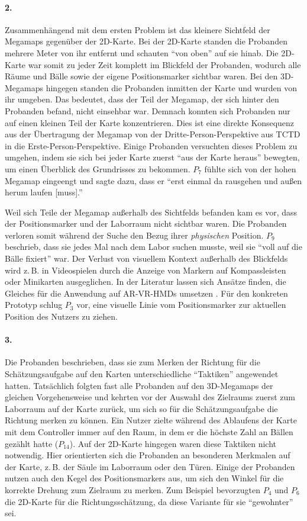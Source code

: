 \paragraph{2.}
Zusammenhängend mit dem ersten Problem ist das kleinere Sichtfeld der Megamaps gegenüber der 2D-Karte.
Bei der 2D-Karte standen die Probanden mehrere Meter von ihr entfernt und schauten \enquote{von oben} auf sie hinab.
Die 2D-Karte war somit zu jeder Zeit komplett im Blickfeld der Probanden, wodurch alle Räume und Bälle sowie der eigene Positionsmarker sichtbar waren.
Bei den 3D-Megamaps hingegen standen die Probanden inmitten der Karte und wurden von ihr umgeben.
Das bedeutet, dass der Teil der Megamap, der sich hinter den Probanden befand, nicht einsehbar war.
Demnach konnten sich Probanden nur auf einen kleinen Teil der Karte konzentrieren.
Dies ist eine direkte Konsequenz aus der Übertragung der Megamap von der Dritte-Person-Perspektive aus TCTD in die Erste-Person-Perspektive.
Einige Probanden versuchten dieses Problem zu umgehen, indem sie sich bei jeder Karte zuerst \enquote{aus der Karte heraus} bewegten, um einen Überblick des Grundrisses zu bekommen.
$P_7$ fühlte sich von der hohen Megamap eingeengt und sagte dazu, dass er \enquote{erst einmal da rausgehen und außen herum laufen [muss].}

Weil sich Teile der Megamap außerhalb des Sichtfelds befanden kam es vor, dass der Positionsmarker und der Laborraum nicht sichtbar waren.
Die Probanden verloren somit während der Suche den Bezug ihrer \emph{physischen} Position.
$P_9$ beschrieb, dass sie jedes Mal nach dem Labor suchen musste, weil sie \enquote{voll auf die Bälle fixiert} war.
Der Verlust von visuellem Kontext außerhalb des Blickfelds wird z.\,B. in Videospielen durch die Anzeige von Markern auf Kompassleisten oder Minikarten ausgeglichen.
In der Literatur lassen sich Ansätze finden, die Gleiches für die Anwendung auf AR-VR-HMDs umsetzen \autocites{Lin2017a}{Gruenefeld2017}.
Für den konkreten Prototyp schlug $P_3$ vor, eine visuelle Linie vom Positionsmarker zur aktuellen Position des Nutzers zu ziehen.

\paragraph{3.}
Die Probanden beschrieben, dass sie zum Merken der Richtung für die Schätzungsaufgabe auf den Karten unterschiedliche \enquote{Taktiken} angewendet hatten.
Tatsächlich folgten fast alle Probanden auf den 3D-Megamaps der gleichen Vorgehensweise und kehrten vor der Auswahl des Zielraums zuerst zum Laborraum auf der Karte zurück, um sich so für die Schätzungsaufgabe die Richtung merken zu können.
Ein Nutzer zielte während des Ablaufens der Karte mit dem Controller immer auf den Raum, in dem er die höchste Zahl an Bällen gezählt hatte ($P_{14}$).
Auf der 2D-Karte hingegen waren diese Taktiken nicht notwendig.
Hier orientierten sich die Probanden an besonderen Merkmalen auf der Karte, z.\,B. der Säule im Laborraum oder den Türen.
Einige der Probanden nutzen auch den Kegel des Positionsmarkers aus, um sich den Winkel für die korrekte Drehung zum Zielraum zu merken.
Zum Beispiel bevorzugten $P_4$ und $P_6$ die 2D-Karte für die Richtungsschätzung, da diese Variante für sie \enquote{gewohnter} sei.

